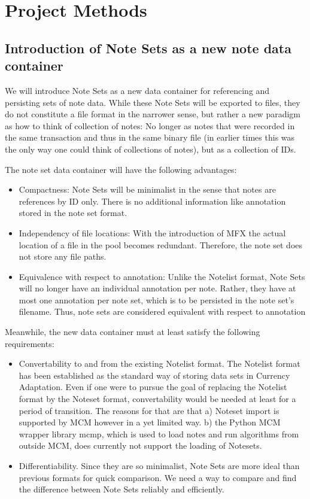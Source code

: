 \chapter{Project Methods}
\label{chap:projectsteps}


\section{Introduction of Note Sets as a new note data container}

We will introduce Note Sets as a new data container for referencing and persisting sets of note data. While these Note Sets will be exported to files, they do not constitute a file format in the narrower sense, but rather a new paradigm as how to think of collection of notes: No longer as notes that were recorded in the same transaction and thus in the same binary file (in earlier times this was the only way one could think of collections of notes), but as a collection of IDs.

The note set data container will have the following advantages:
\begin{itemize}
\item Compactness: Note Sets will be minimalist in the sense that notes are references by ID only. There is no additional information like annotation stored in the note set format.
\item Independency of file locations: With the introduction of MFX the actual location of a file in the pool becomes redundant. Therefore, the note set does not store any file paths.
\item Equivalence with respect to annotation: Unlike the Notelist format, Note Sets will no longer have an individual annotation per note. Rather, they have at most one annotation per note set, which is to be persisted in the note set's filename. Thus, note sets are considered equivalent with respect to annotation
\end{itemize}
Meanwhile, the new data container must at least satisfy the following requirements:
\begin{itemize}
\item Convertability to and from the existing Notelist format. The Notelist format has been established as the standard way of storing data sets in Currency Adaptation. Even if one were to pursue the goal of replacing the Notelist format by the Noteset format, convertability would be needed at least for a period of transition. The reasons for that are that a) Noteset import is supported by MCM however in a yet limited way. b) the Python MCM wrapper library mcmp, which is used to load notes and run algorithms from outside MCM, does currently not support the loading of Notesets.
 \item Differentiability. Since they are so minimalist, Note Sets are more ideal than previous formats for quick comparison. We need a way to compare and find the difference between Note Sets reliably and efficiently.
\end{itemize}

